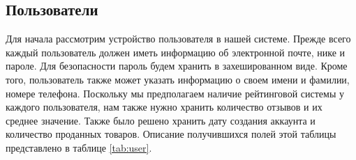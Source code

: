 \documentclass[a4paper,14pt]{extarticle}
\begin{document}
\subsection{Пользователи}

Для начала рассмотрим устройство пользователя в нашей системе. Прежде всего каждый пользователь должен иметь информацию об электронной почте, нике и пароле. Для безопасности пароль будем хранить в захешированном виде. Кроме того, пользователь также может указать информацию о своем имени и фамилии, номере телефона. Поскольку мы предполагаем наличие рейтинговой системы у каждого пользователя, нам также нужно хранить количество отзывов и их среднее значение. Также было решено хранить дату создания аккаунта и количество проданных товаров. Описание получившихся полей этой таблицы представлено в таблице \ref{tab:user}.
\end{document}
